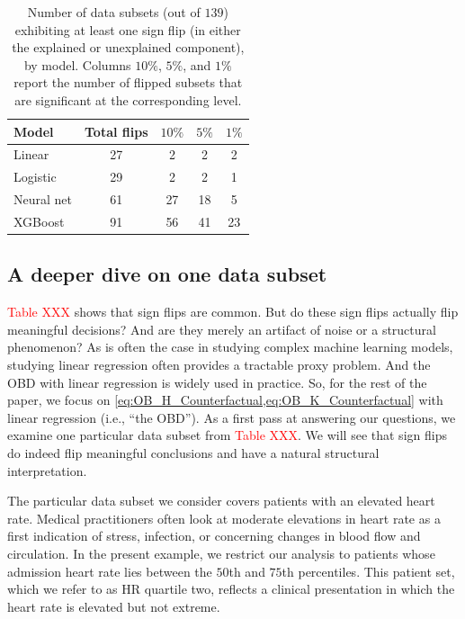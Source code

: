 \begin{table}[!ht]
    \caption{Number of data subsets (out of $139$) exhibiting at least one sign flip (in either the explained or unexplained component), by model. Columns $10\%$, $5\%$, and $1\%$ report the number of flipped subsets that are significant at the corresponding level.}
    \label{tab:flip_summary_main}
    \centering
    \small
    \begin{tabular}{lcccc}
    \toprule
    Model & Total flips & $10\%$ & $5\%$ & $1\%$ \\
    \midrule
    Linear      & 27 &  2 &  2 &  2 \\
    Logistic    & 29 &  2 &  2 &  1 \\
    Neural net  & 61 & 27 & 18 &  5 \\
    XGBoost     & 91 & 56 & 41 & 23 \\
    \bottomrule
    \end{tabular}
\end{table}

\subsection{A deeper dive on one data subset}

\textcolor{red}{Table XXX} shows that sign flips are common.
But do these sign flips actually flip meaningful decisions? And are they merely an artifact of noise or a structural phenomenon?
As is often the case in studying complex machine learning models, studying linear regression often provides a tractable proxy problem.
And the OBD with linear regression is widely used in practice.
So, for the rest of the paper, we focus on \cref{eq:OB_H_Counterfactual,eq:OB_K_Counterfactual} with linear regression (i.e., ``the OBD'').
As a first pass at answering our questions, we examine one particular data subset from \textcolor{red}{Table XXX}.
We will see that sign flips do indeed flip meaningful conclusions and have a natural structural interpretation.

The particular data subset we consider covers patients with an elevated heart rate.
Medical practitioners often look at moderate elevations in heart rate as a first indication of stress, infection, or concerning changes in blood flow and circulation. In the present example, we restrict our analysis to patients whose admission heart rate lies between the $50$th and $75$th percentiles. This patient set, which we refer to as HR quartile two, reflects a clinical presentation in which the heart rate is elevated but not extreme.

